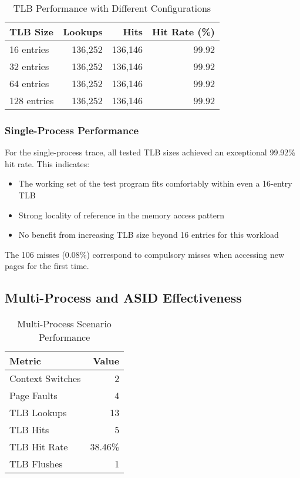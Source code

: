 \documentclass[12pt,a4paper]{article}
\begin{document}
\begin{table}[h]
\centering
\caption{TLB Performance with Different Configurations}
\label{tab:tlb-performance}
\begin{tabular}{lrrr}
\toprule
\textbf{TLB Size} & \textbf{Lookups} & \textbf{Hits} & \textbf{Hit Rate (\%)} \\
\midrule
16 entries & 136,252 & 136,146 & 99.92 \\
32 entries & 136,252 & 136,146 & 99.92 \\
64 entries & 136,252 & 136,146 & 99.92 \\
128 entries & 136,252 & 136,146 & 99.92 \\
\bottomrule
\end{tabular}
\end{table}

\subsubsection{Single-Process Performance}

For the single-process trace, all tested TLB sizes achieved an exceptional 99.92\% hit rate. This indicates:

\begin{itemize}
    \item The working set of the test program fits comfortably within even a 16-entry TLB
    \item Strong locality of reference in the memory access pattern
    \item No benefit from increasing TLB size beyond 16 entries for this workload
\end{itemize}

The 106 misses (0.08\%) correspond to compulsory misses when accessing new pages for the first time.

\subsection{Multi-Process and ASID Effectiveness}

\begin{table}[h]
\centering
\caption{Multi-Process Scenario Performance}
\label{tab:multi-process}
\begin{tabular}{lr}
\toprule
\textbf{Metric} & \textbf{Value} \\
\midrule
Context Switches & 2 \\
Page Faults & 4 \\
TLB Lookups & 13 \\
TLB Hits & 5 \\
TLB Hit Rate & 38.46\% \\
TLB Flushes & 1 \\
\bottomrule
\end{tabular}
\end{table}
\end{document}
